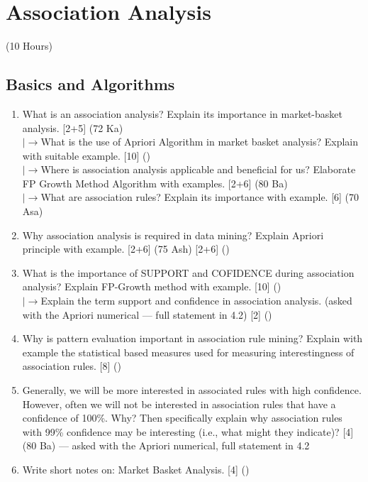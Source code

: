 \documentclass[12pt]{article}
\newcommand{\lb}{\\$\left|\rightarrow\right.$}
\begin{document}
\pagebreak
\section{Association Analysis}
\begin{center}(10 Hours)\end{center}

  \subsection{Basics and Algorithms}
    \begin{enumerate}[topsep=0pt, noitemsep]
      \item What is an association analysis? Explain its importance in market-basket analysis. \hfill [2+5] (72 Ka)
        \lb What is the use of Apriori Algorithm in market basket analysis? Explain with suitable example. \hfill [10] ()
        \lb Where is association analysis applicable and beneficial for us? Elaborate FP Growth Method Algorithm with examples. \hfill [2+6] (80 Ba)
        \lb What are association rules? Explain its importance with example. \hfill [6] (70 Asa)

      \item Why association analysis is required in data mining? Explain Apriori principle with example. \hfill [2+6] (75 Ash) [2+6] ()

      \item What is the importance of SUPPORT and COFIDENCE during association analysis? Explain FP-Growth method with example. \hfill [10] ()
        \lb Explain the term support and confidence in association analysis. (asked with the Apriori numerical --- full statement in 4.2) \hfill [2] ()

      \item Why is pattern evaluation important in association rule mining? Explain with example the statistical based measures used for measuring interestingness of association rules. \hfill [8] ()

      \item Generally, we will be more interested in associated rules with high confidence. However, often we will not be interested in association rules that have a confidence of 100\%. Why? Then specifically explain why association rules with 99\% confidence may be interesting (i.e., what might they indicate)? \hfill [4] (80 Ba) --- asked with the Apriori numerical, full statement in 4.2

      \item Write short notes on: Market Basket Analysis. \hfill [4] ()
    \end{enumerate}
\end{document}
